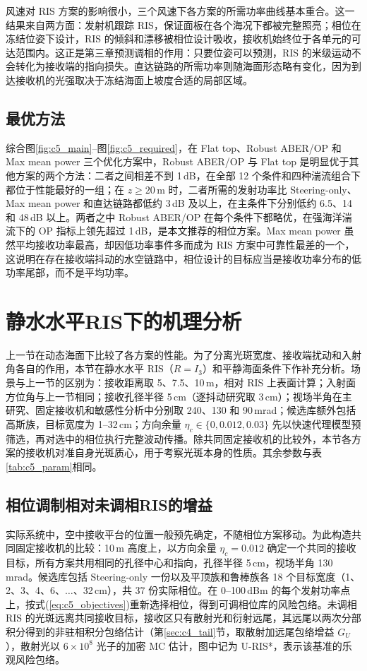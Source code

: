风速对 RIS 方案的影响很小，三个风速下各方案的所需功率曲线基本重合。这一结果来自两方面：发射机跟踪 RIS，保证面板在各个海况下都被完整照亮；相位在冻结位姿下设计，RIS 的倾斜和漂移被相位设计吸收，接收机始终位于各单元的可达范围内。这正是第三章预测调相的作用：只要位姿可以预测，RIS 的米级运动不会转化为接收端的指向损失。直达链路的所需功率则随海面形态略有变化，因为到达接收机的光强取决于冻结海面上坡度合适的局部区域。

\subsection{最优方法}

综合图\ref{fig:c5_main}--图\ref{fig:c5_required}，在 Flat top、Robust ABER/OP 和 Max mean power 三个优化方案中，Robust ABER/OP 与 Flat top 是明显优于其他方案的两个方法：二者之间相差不到 1\,dB，在全部 12 个条件和四种湍流组合下都位于性能最好的一组；在 $z\ge20\,\mathrm m$ 时，二者所需的发射功率比 Steering-only、Max mean power 和直达链路都低约 3\,dB 及以上，在主条件下分别低约 6.5、14 和 48\,dB 以上。两者之中 Robust ABER/OP 在每个条件下都略优，在强海洋湍流下的 OP 指标上领先超过 1\,dB，是本文推荐的相位方案。Max mean power 虽然平均接收功率最高，却因低功率事件多而成为 RIS 方案中可靠性最差的一个，这说明在存在接收端抖动的水空链路中，相位设计的目标应当是接收功率分布的低功率尾部，而不是平均功率。

\section{静水水平RIS下的机理分析}
\label{sec:c5_calm}

上一节在动态海面下比较了各方案的性能。为了分离光斑宽度、接收端扰动和入射角各自的作用，本节在静水水平 RIS（$R=I_3$）和平静海面条件下作补充分析。场景与上一节的区别为：接收距离取 5、7.5、10\,m，相对 RIS 上表面计算；入射面方位角与上一节相同；接收孔径半径 5\,cm（逐抖动研究取 3\,cm）；视场半角在主研究、固定接收机和敏感性分析中分别取 240、130 和 90\,mrad；候选库额外包括高斯族，目标宽度为 1--32\,cm；方向余量 $\eta_c\in\{0,0.012,0.03\}$ 先以快速代理模型预筛选，再对选中的相位执行完整波动传播。除共同固定接收机的比较外，本节各方案的接收机对准自身光斑质心，用于考察光斑本身的性质。其余参数与表\ref{tab:c5_param}相同。

\subsection{相位调制相对未调相RIS的增益}

实际系统中，空中接收平台的位置一般预先确定，不随相位方案移动。为此构造共同固定接收机的比较：10\,m 高度上，以方向余量 $\eta_c=0.012$ 确定一个共同的接收目标，所有方案共用相同的孔径中心和指向，孔径半径 5\,cm，视场半角 130\,mrad。候选库包括 Steering-only 一份以及平顶族和鲁棒族各 18 个目标宽度（1、2、3、4、6、$\ldots$、32\,cm），共 37 份实际相位。在 0--100\,dBm 的每个发射功率点上，按式(\ref{eq:c5_objectives})重新选择相位，得到可调相位库的风险包络。未调相 RIS 的光斑远离共同接收目标，接收区只有散射光和衍射远尾，其远尾以两次分部积分得到的非驻相积分包络估计（第\ref{sec:c4_tail}节，取散射加远尾包络增益 $G_U$），散射光以 $6\times10^8$ 光子的加密 MC 估计，图中记为 U-RIS*，表示该基准的乐观风险包络。

